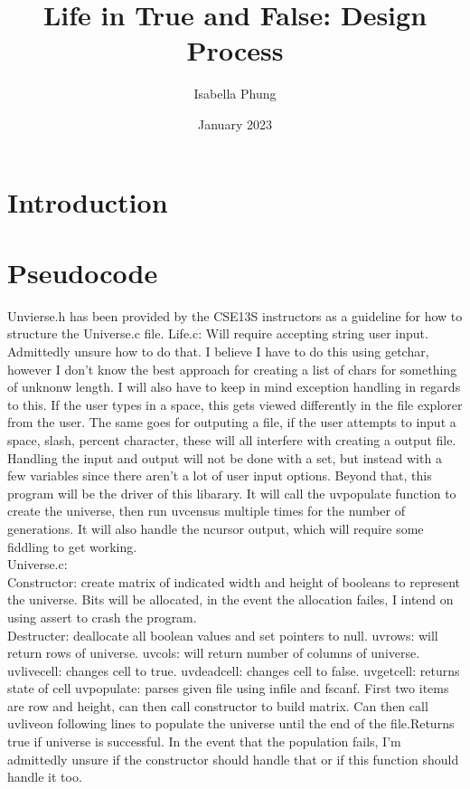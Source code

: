 \documentclass{article}
\title{Life in True and False: Design Process}
\author{Isabella Phung}
\date{January 2023}
\begin{document}
\maketitle

\section{Introduction}
\section{Pseudocode}
Unvierse.h has been provided by the CSE13S instructors as a guideline for how to structure the Universe.c file.
Life.c: Will require accepting string user input. Admittedly unsure how to do that. I believe I have to do this using getchar, however I don't know the best approach for creating a list of chars for something of unknonw length. I will also have to keep in mind exception handling in regards to this. If the user types in a space, this gets viewed differently in the file explorer from the user. The same goes for outputing a file, if the user attempts to input a space, slash, percent character, these will all interfere with creating a output file. Handling the input and output will not be done with a set, but instead with a few variables since there aren't a lot of user input options. 
Beyond that, this program will be the driver of this libarary. It will call the uv\textunderscore populate function to create the universe, then run uv\textunderscore census multiple times for the number of generations. It will also handle the ncursor output, which will require some fiddling to get working. \\
Universe.c:\\
Constructor: create matrix of indicated width and height of booleans to represent the universe. Bits will be allocated, in the event the allocation failes, I intend on using assert to crash the program.\\
Destructer: deallocate all boolean values and set pointers to null.
uv\textunderscore rows: will return rows of universe.
uv\textunderscore cols: will return number of columns of universe.
uv\textunderscore live\textunderscore cell: changes cell to true.
uv\textunderscore dead\textunderscore cell: changes cell to false.
uv\textunderscore get\textunderscore cell: returns state of cell
uv\textunderscore populate: parses given file using infile and fscanf. First two items are row and height, can then call constructor to build matrix. Can then call uv\textunderscore live\textunderscore on following lines to populate the universe until the end of the file.Returns true if universe is successful. In the event that the population fails, I'm admittedly unsure if the constructor should handle that or if this function should handle it too.
\end{document}
